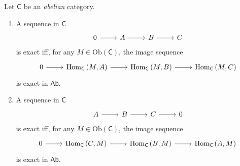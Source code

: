 \documentclass[../Main]{subfiles}
\begin{document}
\begin{lem}\label{lem:HomExactnessEquivalence}
	Let $\mathsf{C}$ be an {\em abelian} category.
	\begin{enumerate}
		\item A sequence in $\mathsf{C}$
			\begin{equation}
			\begin{tikzcd}
				0 \arrow[r, "", rightarrow] &
				A \arrow[r, "", rightarrow] &
				B \arrow[r, "", rightarrow] &
				C
			\end{tikzcd}
			\end{equation} 
			is exact iff, for any $M \in \mathrm{Ob} \left(\mathsf{C}\right)$,
			the image sequence
			\begin{equation}
			\begin{tikzcd}
				0 \arrow[r, "", rightarrow] &
				\mathrm{Hom}_{\mathsf{C}} \left( M, A \right) \arrow[r, "", rightarrow] &
				\mathrm{Hom}_{\mathsf{C}} \left( M, B \right) \arrow[r, "", rightarrow] &
				\mathrm{Hom}_{\mathsf{C}} \left( M, C \right)
			\end{tikzcd}
			\end{equation} 
			is exact in $\mathsf{Ab}$.

		\item A sequence in $\mathsf{C}$
			\begin{equation}
			\begin{tikzcd}
				A \arrow[r, "", rightarrow] &
				B \arrow[r, "", rightarrow] &
				C \arrow[r, "", rightarrow] &
				0
			\end{tikzcd}
			\end{equation} 
			is exact iff, for any $M \in \mathrm{Ob} \left(\mathsf{C}\right)$,
			the image sequence
			\begin{equation}
			\begin{tikzcd}
				0 \arrow[r, "", rightarrow] &
				\mathrm{Hom}_{\mathsf{C}} \left( C, M \right) \arrow[r, "", rightarrow] &
				\mathrm{Hom}_{\mathsf{C}} \left( B, M \right) \arrow[r, "", rightarrow] &
				\mathrm{Hom}_{\mathsf{C}} \left( A, M \right)
			\end{tikzcd}
			\end{equation} 
			is exact in $\mathsf{Ab}$.
	\end{enumerate}
\end{lem} 
\end{document}
